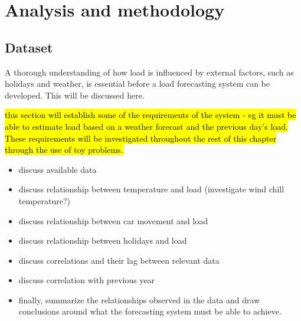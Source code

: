 \chapter{Analysis and methodology}
\section{Dataset}
A thorough understanding of how load is influenced by external factors, such as holidays and weather, is essential before a load forecasting system can be developed. This will be discussed here.
\par
\hl{this section will establish some of the requirements of the system - eg it must be able to estimate load based on a weather forecast and the previous day's load. These requirements will be investigated throughout the rest of this chapter through the use of toy problems.}

\begin{itemize}
	\item discuss available data
	\item discuss relationship between temperature and load (investigate wind chill temperature?)
	\item discuss relationship between car movement and load
	\item discuss relationship between holidays and load
	\item discuss correlations and their lag between relevant data
	\item discuss correlation with previous year
	\item finally, summarize the relationships observed in the data and draw conclusions around what the forecasting system must be able to achieve.
\end{itemize}


